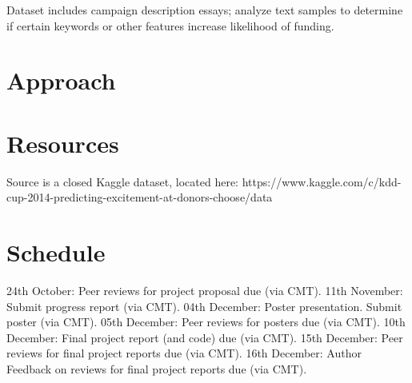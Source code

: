 \documentclass{article}
\begin{document}
 


Dataset includes campaign description essays; analyze text samples to determine if certain keywords or other features increase likelihood of funding.
\section{Approach}


\section{Resources}

Source is a closed Kaggle dataset, located here: https://www.kaggle.com/c/kdd-cup-2014-predicting-excitement-at-donors-choose/data

\section{Schedule}



24th October: Peer reviews for project proposal due (via CMT).
11th November: Submit progress report (via CMT).
04th December: Poster presentation. Submit poster (via CMT).
05th December: Peer reviews for posters due (via CMT).
10th December: Final project report (and code) due (via CMT).
15th December: Peer reviews for final project reports due (via CMT).
16th December: Author Feedback on reviews for final project reports due (via CMT).
\end{document}
